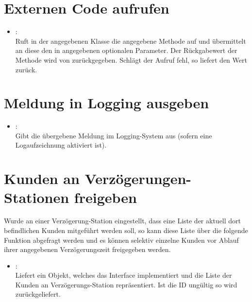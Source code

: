 \section{Externen Code aufrufen}

\begin{itemize}

\item
{}:\\
Ruft in der angegebenen Klasse die angegebene Methode auf und übermittelt an diese den in
 angegebenen optionalen Parameter. Der Rückgabewert der Methode wird von 
zurückgegeben. Schlägt der Aufruf fehl, so liefert  den Wert  zurück.
\end{itemize}

\section{Meldung in Logging ausgeben}

\begin{itemize}

\item
{}:\\
Gibt die übergebene Meldung im Logging-System aus (sofern eine Logaufzeichnung aktiviert ist).

\end{itemize}

\section{Kunden an Verzögerungen-Stationen freigeben}

Wurde an einer Verzögerung-Station eingestellt, dass eine Liste der aktuell dort befindlichen Kunden
mitgeführt werden soll, so kann diese Liste über die folgende Funktion abgefragt werden und es können
selektiv einzelne Kunden vor Ablauf ihrer angegebenen Verzögerungszeit freigegeben werden.

\begin{itemize}

\item
{}:\\
Liefert ein Objekt, welches das Interface  implementiert und die Liste
der Kunden an Verzögerungs-Station  repräsentiert. Ist die ID ungültig
so wird  zurückgeliefert. 
\end{itemize}



